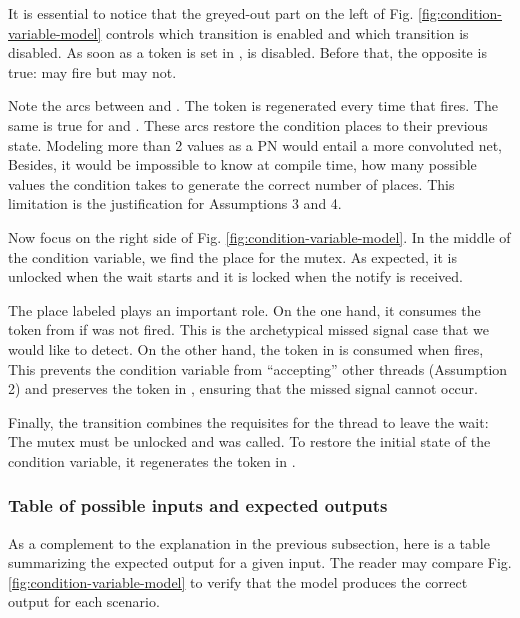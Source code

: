 It is essential to notice that the greyed-out part
on the left of Fig. \ref{fig:condition-variable-model}
controls which transition is enabled and which transition is disabled.
As soon as a token is set in ,  is disabled.
Before that, the opposite is true:  may fire but  may not.

Note the arcs between  and .
The token is regenerated every time that  fires.
The same is true for  and .
These arcs restore the condition places to their previous state.
Modeling more than 2 values as a \acrshort{PN} would entail a more convoluted net,
Besides, it would be impossible to know at compile time,
how many possible values the condition takes to generate the correct number of places.
This limitation is the justification for Assumptions 3 and 4.

Now focus on the right side of Fig. \ref{fig:condition-variable-model}.
In the middle of the condition variable, we find the place for the mutex.
As expected, it is unlocked when the wait starts
and it is locked when the notify is received.

The place labeled  plays an important role.
On the one hand, it consumes the token from 
if  was not fired.
This is the archetypical missed signal case that we would like to detect.
On the other hand, the token in 
is consumed when  fires,
This prevents the condition variable from ``accepting'' other threads (Assumption 2)
and preserves the token in , ensuring that the missed signal cannot occur.

Finally, the  transition combines the requisites
for the thread to leave the wait: The mutex must be unlocked and  was called.
To restore the initial state of the condition variable,
it regenerates the token in .

\subsubsection{Table of possible inputs and expected outputs}

As a complement to the explanation in the previous subsection,
here is a table summarizing the expected output for a given input.
The reader may compare Fig. \ref{fig:condition-variable-model} to verify that
the model produces the correct output for each scenario.

